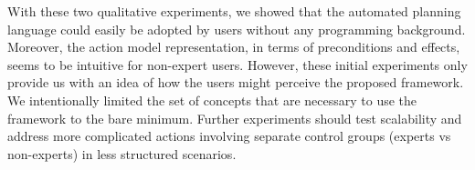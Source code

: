 With these two qualitative experiments, we showed that the automated planning language could easily be adopted by users without any programming background. Moreover, the action model representation, in terms of preconditions and effects, seems to be intuitive for non-expert users. 
However, these initial experiments only provide us with an idea of how the users might perceive the proposed framework. We intentionally limited the set of concepts that are necessary to use the framework to the bare minimum. Further experiments should test scalability and address more complicated actions involving separate control groups (experts vs non-experts) in less structured scenarios. 

